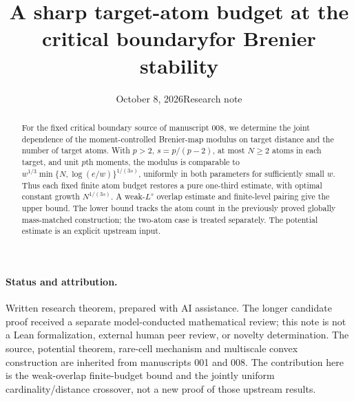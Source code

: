 \documentclass[11pt]{article}
\title{A sharp target-atom budget at the critical boundary\newline for Brenier stability}
\author{}
\date{October 8, 2026\quad Research note}
\theoremstyle{remark}\newtheorem{remark}[theorem]{Remark}
\begin{document}
\maketitle
\begin{abstract}
For the fixed critical boundary source of manuscript 008, we determine the joint dependence of the moment-controlled Brenier-map modulus on target distance and the number of target atoms. With $p>2$, $s=p/(p-2)$, at most $N\ge2$ atoms in each target, and unit $p$th moments, the modulus is comparable to $w^{1/3}\min\{N,\log(e/w)\}^{1/(3s)}$, uniformly in both parameters for sufficiently small $w$. Thus each fixed finite atom budget restores a pure one-third estimate, with optimal constant growth $N^{1/(3s)}$. A weak-$L^s$ overlap estimate and finite-level pairing give the upper bound. The lower bound tracks the atom count in the previously proved globally mass-matched construction; the two-atom case is treated separately. The potential estimate is an explicit upstream input.
\end{abstract}
\paragraph{Status and attribution.}
Written research theorem, prepared with AI assistance. The longer candidate proof received a separate model-conducted mathematical review; this note is not a Lean formalization, external human peer review, or novelty determination. The source, potential theorem, rare-cell mechanism and multiscale convex construction are inherited from manuscripts 001 and 008. The contribution here is the weak-overlap finite-budget bound and the jointly uniform cardinality/distance crossover, not a new proof of those upstream results.
\end{document}

